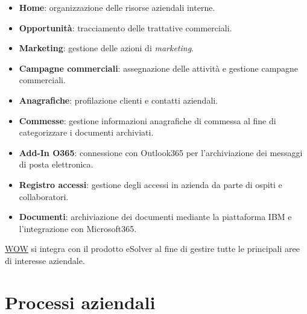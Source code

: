 \begin{itemize}
    \item \textbf{Home}: organizzazione delle risorse aziendali interne. 
    \item \textbf{Opportunità}: tracciamento delle trattative commerciali. 
    \item \textbf{Marketing}: gestione delle azioni di \emph{marketing}. 
    \item \textbf{Campagne commerciali}: assegnazione delle attività e gestione campagne commerciali.
    \item \textbf{Anagrafiche}: profilazione clienti e contatti aziendali. 
    \item \textbf{Commesse}: gestione informazioni anagrafiche di commessa al fine di categorizzare i documenti archiviati.
    \item \textbf{Add-In O365}: connessione con Outlook365 per l'archiviazione dei messaggi di posta elettronica.
    \item \textbf{Registro accessi}: gestione degli accessi in azienda da parte di ospiti e collaboratori.
    \item \textbf{Documenti}: archiviazione dei documenti mediante la piattaforma IBM e l'integrazione con Microsoft365.\\
\end{itemize}
\hyperref[WOW]{WOW} si integra con il prodotto eSolver al fine di gestire tutte le principali aree di interesse aziendale. 

\section{Processi aziendali}
